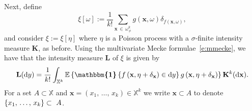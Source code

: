 \documentclass[10pt]{amsart}
\theoremstyle{definition}\newtheorem{defi}[theo]{Definition}\newtheorem{rema}[theo]{Remark}\newtheorem{exam}[theo]{Example}\newtheorem{exem}[theo]{Example}\newtheorem{nota}[theo]{Notation}
\newcommand*\bL{\mathbf{L}}
\newcommand*\bK{\mathbf{K}}
\newcommand{\bx}{\mathbf{x}}
\newcommand*\X{\mathbb{X}}
\newcommand{\E}{\mathbb{E}}
\newcommand*\md{\mathrm{d}}
\newcommand{\mean}[1] {\E\left\{{#1}\right\}}
\newcommand{\ind}{\boldsymbol{\mathbbm{1}}}
\newcommand{\set}[1]{\left\{#1\right\}}
\begin{document}
Next, define
\begin{equation}\label{e:defn_xi_ld}
\xi[\omega] := \frac{1}{k!}\sum_{\bx\,\in\,\omega^k_{\ne}}g(\bx,\omega)\delta_{f(\bx,\omega)},
\end{equation}
and consider $\xi:=\xi[\eta]$ where $\eta$ is a Poisson process with {a $\sigma$-finite} intensity measure $\bK$, as before. Using the multivariate Mecke formulae~\eqref{e:mmecke}, we have that the intensity measure $\bL$ of $\xi$ is given by
\begin{equation}\label{e:int_L_ld}
\bL(\md y) = \frac{1}{k!}\int_{\X^k} \mean{\ind\set{f\left(\bx,\eta+\delta_{\bx}\right) \in \md y} g\left(\bx,\eta+\delta_{\bx}\right)} \bK^k(\md \bx).
\end{equation}
For a set $A\subset \X$ and $\bx=(x_1,\,\hdots,\,x_k)\in\X^k$ we write $\bx\subset A$ to denote $\{x_1,\,\hdots,\,x_k\}\linebreak\subset~A$.
\end{document}

